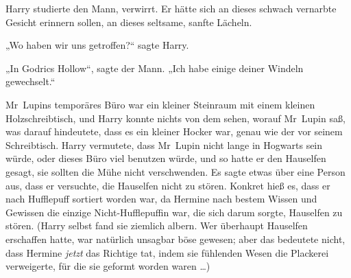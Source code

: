 Harry studierte den Mann, verwirrt. Er hätte sich an dieses schwach vernarbte Gesicht erinnern sollen, an dieses seltsame, sanfte Lächeln.

„Wo haben wir uns getroffen?“ sagte Harry.

„In Godrics Hollow“, sagte der Mann.
„Ich habe einige deiner Windeln gewechselt.“

\later

Mr~Lupins temporäres Büro war ein kleiner Steinraum mit einem kleinen Holzschreibtisch, und Harry konnte nichts von dem sehen, worauf Mr~Lupin saß, was darauf hindeutete, dass es ein kleiner Hocker war, genau wie der vor seinem Schreibtisch. Harry vermutete, dass Mr~Lupin nicht lange in Hogwarts sein würde, oder dieses Büro viel benutzen würde, und so hatte er den Hauselfen gesagt, sie sollten die Mühe nicht verschwenden. Es sagte etwas über eine Person aus, dass er versuchte, die Hauselfen nicht zu stören. Konkret hieß es, dass er nach Hufflepuff sortiert worden war, da Hermine nach bestem Wissen und Gewissen die einzige Nicht-Hufflepuffin war, die sich darum sorgte, Hauselfen zu stören. (Harry selbst fand sie ziemlich albern. Wer überhaupt Hauselfen erschaffen hatte, war natürlich unsagbar böse gewesen; aber das bedeutete nicht, dass Hermine \emph{jetzt} das Richtige tat, indem sie fühlenden Wesen die Plackerei verweigerte, für die sie geformt worden waren …)

